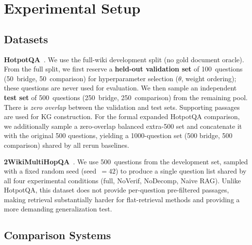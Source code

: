 \documentclass[runningheads]{llncs}
\begin{document}
\section{Experimental Setup}
\label{sec:setup}

\subsection{Datasets}

\textbf{HotpotQA}~\cite{yang2018hotpotqa}. We use the full-wiki development
split (no gold document oracle). From the full split, we first reserve a
\textbf{held-out validation set} of 100~questions (50~bridge, 50~comparison)
for hyperparameter selection ($\theta$, weight ordering); these questions are
never used for evaluation. We then sample an independent \textbf{test set}
of 500~questions (250~bridge, 250~comparison) from the remaining pool.
There is \emph{zero overlap} between the validation and test sets.
Supporting passages are used for KG construction. For the formal expanded
HotpotQA comparison, we additionally sample a zero-overlap balanced extra-500
set and concatenate it with the original 500 questions, yielding a
1000-question set (500 bridge, 500 comparison) shared by all rerun baselines.

\textbf{2WikiMultiHopQA}~\cite{ho2020constructing}. We use 500~questions
from the development set, sampled with a fixed random seed (seed~$=42$) to
produce a single question list shared by all four experimental conditions
(full, NoVerif, NoDecomp, Naive RAG). Unlike HotpotQA, this dataset does not
provide per-question pre-filtered passages, making retrieval substantially
harder for flat-retrieval methods and providing a more demanding generalization
test.

\subsection{Comparison Systems}
\end{document}

